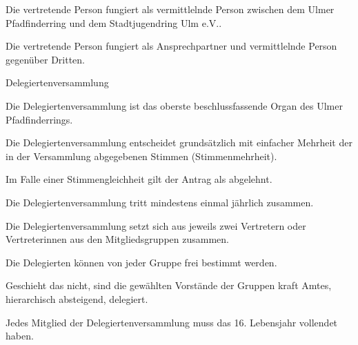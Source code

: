 \begin{legal}
\begin{legal}
\begin{legal}
                  \end{legal}
            \item Die vertretende Person fungiert als vermittlelnde Person zwischen dem 
                  Ulmer Pfadfinderring und dem Stadtjugendring Ulm e.V..
            \item Die vertretende Person fungiert als Ansprechpartner und vermittlelnde 
                  Person gegenüber Dritten.
        \end{legal}
    \item Delegiertenversammlung
        \begin{legal}
            \item Die Delegiertenversammlung ist das oberste beschlussfassende Organ
                  des Ulmer Pfadfinderrings.
            \item Die Delegiertenversammlung entscheidet grundsätzlich mit einfacher Mehrheit der 
                  in der Versammlung abgegebenen Stimmen (Stimmenmehrheit).
            \item Im Falle einer Stimmengleichheit gilt der Antrag als abgelehnt.
            \item Die Delegiertenversammlung tritt mindestens einmal jährlich zusammen.
            \item Die Delegiertenversammlung setzt sich aus jeweils zwei Vertretern oder 
                  Vertreterinnen aus den Mitgliedsgruppen zusammen.
                \begin{legal}
                    \item Die Delegierten können von jeder Gruppe frei bestimmt werden.
                    \item Geschieht das nicht, sind die gewählten Vorstände der Gruppen kraft Amtes, 
                          hierarchisch absteigend, delegiert.
                \end{legal}
            \item Jedes Mitglied der Delegiertenversammlung muss das 16. Lebensjahr vollendet haben.

\end{legal}
\end{legal}
